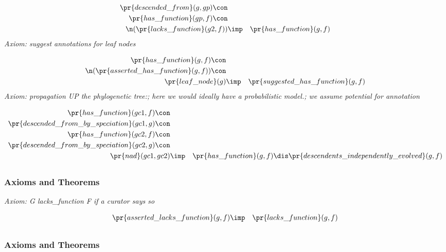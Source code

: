 \begin{eqnarray*}
 \pr{descended\_from}(g, gp) \con \\
 \pr{has\_function}(gp, f) \con \\
 \n( \pr{lacks\_function}(g2, f) )&\imp & \pr{has\_function}(g, f) 
\end{eqnarray*}
\emph{Axiom: suggest annotations for leaf nodes}

\begin{eqnarray*}
 \pr{has\_function}(g, f) \con \\
 \n( \pr{asserted\_has\_function}(g, f) )\con \\
 \pr{leaf\_node}(g) &\imp & \pr{suggested\_has\_function}(g, f) 
\end{eqnarray*}
\emph{Axiom: propagation UP the phylogenetic tree:; here we would ideally have a probabilistic model.; we assume potential for annotation }

\begin{eqnarray*}
 \pr{has\_function}(gc1, f) \con \\
 \pr{descended\_from\_by\_speciation}(gc1, g) \con \\
 \pr{has\_function}(gc2, f) \con \\
 \pr{descended\_from\_by\_speciation}(gc2, g) \con \\
 \pr{nad}(gc1, gc2) &\imp & \pr{has\_function}(g, f) \dis  \pr{descendents\_independently\_evolved}(g, f) 
\end{eqnarray*}
\subsection*{ }
\subsubsection*{Axioms and Theorems}

\emph{Axiom: G lacks\_function F if a curator says so}

\begin{eqnarray*}
 \pr{asserted\_lacks\_function}(g, f) &\imp & \pr{lacks\_function}(g, f) 
\end{eqnarray*}
\subsection*{ }
\subsubsection*{Axioms and Theorems}

